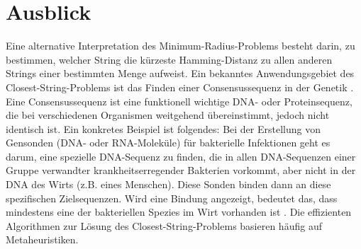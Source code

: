 \documentclass[11pt]{article}
\theoremstyle{break}
\theoremstyle{norm}
\begin{document}
\section{Ausblick}\label{absch5}
Eine alternative Interpretation des Minimum-Radius-Problems besteht darin, zu be\-stimmen, welcher String die kürzeste Hamming-Distanz zu allen anderen Strings einer bestimmten Menge aufweist.
Ein bekanntes Anwendungsgebiet des Closest-String-Pro\-blems ist das Finden einer Consensussequenz in der Genetik \cite{Festa2011EfficientSF}. Eine Consensussequenz ist eine funktionell wichtige DNA- oder Proteinsequenz, die bei verschiedenen Organismen weitgehend übereinstimmt, jedoch nicht identisch ist. Ein konkretes Beispiel ist folgendes:
Bei der Erstellung von Gensonden (DNA- oder RNA-Moleküle) für bakterielle Infektionen geht es darum, eine spezielle DNA-Sequenz zu finden, die in allen DNA-Sequenzen einer Gruppe verwandter krankheitserregender Bakterien vorkommt, aber nicht in der DNA des Wirts (z.B. eines Menschen). Diese Sonden binden dann an diese spezifischen Zielsequenzen. Wird eine Bindung angezeigt, bedeutet das, dass mindestens eine der bakteriellen Spezies im Wirt vorhanden ist \cite{Festa2011EfficientSF}.
Die effizienten Algorithmen zur Lösung des Closest-String-Problems basieren häufig auf Metaheuristiken.
 \newpage
 
 


%
%
\end{document}

